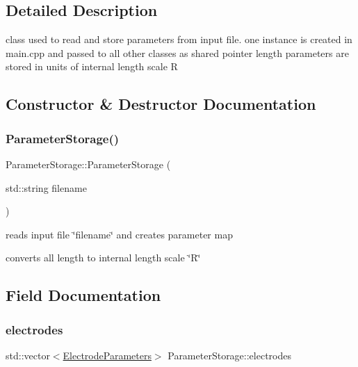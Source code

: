 \subsection{Detailed Description}
class used to read and store parameters from input file. one instance is created in main.\+cpp and passed to all other classes as shared pointer length parameters are stored in units of internal length scale R 

\subsection{Constructor \& Destructor Documentation}
\mbox{\label{classParameterStorage_a024e6d70a1b33d29e64f72657fb15ba8}} 
\subsubsection{\texorpdfstring{Parameter\+Storage()}{ParameterStorage()}}
{\footnotesize\ttfamily Parameter\+Storage\+::\+Parameter\+Storage (\begin{DoxyParamCaption}\item[{std\+::string}]{filename }\end{DoxyParamCaption})}


\begin{DoxyItemize}
\item reads input file \char`\"{}filename\char`\"{} and creates parameter map
\item converts all length to internal length scale \char`\"{}\+R\char`\"{} 
\end{DoxyItemize}

\subsection{Field Documentation}
\mbox{\label{classParameterStorage_aec3f7cac18829cd67387d9a568547dbf}} 
\subsubsection{\texorpdfstring{electrodes}{electrodes}}
{\footnotesize\ttfamily std\+::vector$<$\hyperlink{structElectrodeParameters}{Electrode\+Parameters}$>$ Parameter\+Storage\+::electrodes}


